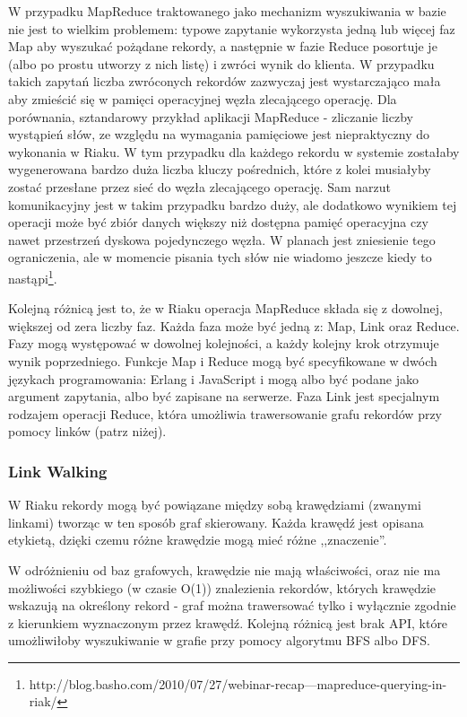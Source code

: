 W przypadku MapReduce traktowanego jako mechanizm wyszukiwania w bazie nie jest to wielkim problemem: typowe zapytanie wykorzysta jedną lub więcej faz Map aby wyszukać pożądane rekordy, a następnie w fazie Reduce posortuje je (albo po prostu utworzy z nich listę) i zwróci wynik do klienta.
W przypadku takich zapytań liczba zwróconych rekordów zazwyczaj jest wystarczająco mała aby zmieścić się w pamięci operacyjnej węzła zlecającego operację.
Dla porównania, sztandarowy przykład aplikacji MapReduce - zliczanie liczby wystąpień słów, ze względu na wymagania pamięciowe jest niepraktyczny do wykonania w Riaku.
W tym przypadku dla każdego rekordu w systemie zostałaby wygenerowana bardzo duża liczba kluczy pośrednich, które z kolei musiałyby zostać przesłane przez sieć do węzła zlecającego operację.
Sam narzut komunikacyjny jest w takim przypadku bardzo duży, ale dodatkowo wynikiem tej operacji może być zbiór danych większy niż dostępna pamięć operacyjna czy nawet przestrzeń dyskowa pojedynczego węzła.
W planach jest zniesienie tego ograniczenia, ale w momencie pisania tych słów nie wiadomo jeszcze kiedy to nastąpi\footnote{http://blog.basho.com/2010/07/27/webinar-recap---mapreduce-querying-in-riak/}.

Kolejną różnicą jest to, że w Riaku operacja MapReduce składa się z dowolnej, większej od zera liczby faz.
Każda faza może być jedną z: Map, Link oraz Reduce.
Fazy mogą występować w dowolnej kolejności, a każdy kolejny krok otrzymuje wynik poprzedniego.
Funkcje Map i Reduce mogą być specyfikowane w dwóch językach programowania: Erlang i JavaScript i mogą albo być podane jako argument zapytania, albo być zapisane na serwerze.
Faza Link jest specjalnym rodzajem operacji Reduce, która umożliwia trawersowanie grafu rekordów przy pomocy linków (patrz niżej).

\subsubsection*{Link Walking}

W Riaku rekordy mogą być powiązane między sobą krawędziami (zwanymi linkami) tworząc w ten sposób graf skierowany.
Każda krawędź jest opisana etykietą, dzięki czemu różne krawędzie mogą mieć różne ,,znaczenie''.

W odróżnieniu od baz grafowych, krawędzie nie mają właściwości, oraz nie ma możliwości szybkiego (w czasie O(1)) znalezienia rekordów, których krawędzie wskazują na określony rekord - graf można trawersować tylko i wyłącznie zgodnie z kierunkiem wyznaczonym przez krawędź.
Kolejną różnicą jest brak API, które umożliwiłoby wyszukiwanie w grafie przy pomocy algorytmu BFS albo DFS.

